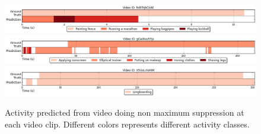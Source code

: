 \begin{figure}[H]
\begin{center}
\includegraphics[width=1\linewidth]{img/results/activity_detection_multiple/activity_detection_sample_9}
\includegraphics[width=1\linewidth]{img/results/activity_detection_multiple/activity_detection_sample_10}
\includegraphics[width=1\linewidth]{img/results/activity_detection_multiple/activity_detection_sample_11}
\end{center}
\caption{Activity predicted from video doing non maximum suppression at each video clip. Different colors represents different activity classes.}
\label{fig:results_visualization_detection_classes}
\end{figure}
